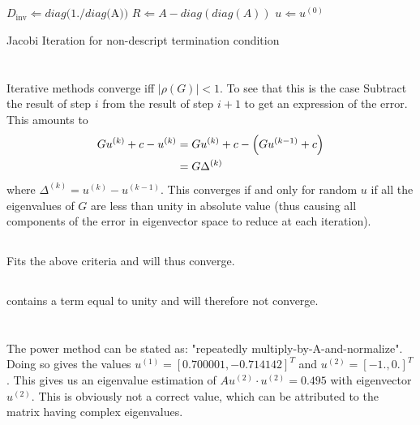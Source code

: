   \subsection{}
  \begin{algorithm}[H]
    $D_{\text{inv}} \Leftarrow diag(1./diag($A$))$\;
    $R \Leftarrow A-diag(diag(A))$\;
    $u \Leftarrow u^{(0)}$\;
    \caption{Jacobi Iteration for non-descript termination condition}
    \label{alg:jacobi}
  \end{algorithm}

\section{}
  Iterative methods converge iff $\left|{\rho(G)}\right| < 1$. To see that this is the case
  Subtract the result of step $i$ from the result of step $i+1$ to get an expression of the error.
  This amounts to
  \begin{align}
    Gu^{(k)}+c-u^{(k)} &= Gu^{(k)}+c - \left(Gu^{(k-1)}+c\right)\\\nonumber
    &= G\Delta^{(k)}
  \end{align}
   where $\Delta^{(k)} = u^{(k)}-u^{(k-1)}$. This converges if and only for random $u$ if all the eigenvalues of $G$ are less than unity in absolute value (thus causing all components of the error in eigenvector space to reduce at each iteration).

  \subsection{}
   Fits the above criteria and will thus converge.
  \subsection{}
   contains a term equal to unity and will therefore not converge.

\section{}
The power method can be stated as: "repeatedly multiply-by-A-and-normalize".
Doing so gives the values $u^{(1)} = \left[0.700001, -0.714142\right]^T$ and $u^{(2)} = \left[-1., 0.\right]^T$.
This gives us an eigenvalue estimation of $Au^{(2)}\cdot u^{(2)} = 0.495$ with eigenvector $u^{(2)}$. This is obviously not a correct value, which can be attributed to the matrix having complex eigenvalues.



